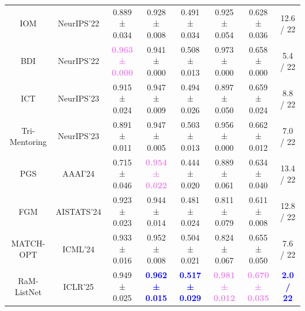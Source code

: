 \begin{table}[t!]
{\begin{tabular}{c|c|ccccc|c}
    IOM  & NeurIPS'22             & 0.889 ± 0.034                              & 0.928 ± 0.008                              & 0.491 ± 0.034                              & 0.925 ± 0.054                              & 0.628 ± 0.036                              & 12.6 / 22                             \\
    BDI   & NeurIPS'22            & \textbf{\textcolor{violet}{0.963 ± 0.000}} & 0.941 ± 0.000                              & 0.508 ± 0.013                              & 0.973 ± 0.000                              & 0.658 ± 0.000                              & 5.4 / 22                              \\
    ICT  & NeurIPS'23             & 0.915 ± 0.024                              & 0.947 ± 0.009                              & 0.494 ± 0.026                              & 0.897 ± 0.050                              & 0.659 ± 0.024                              & 8.8 / 22                              \\
    Tri-Mentoring & NeurIPS'23    & 0.891 ± 0.011                              & 0.947 ± 0.005                              & 0.503 ± 0.013                              & 0.956 ± 0.000                              & 0.662 ± 0.012                              & 7.0 / 22                              \\
    PGS  & AAAI'24             & 0.715 ± 0.046                              & \textbf{\textcolor{violet}{0.954 ± 0.022}} & 0.444 ± 0.020                              & 0.889 ± 0.061                              & 0.634 ± 0.040                              & 13.4 / 22                             \\
    FGM   & AISTATS'24            & 0.923 ± 0.023                              & 0.944 ± 0.014                              & 0.481 ± 0.024                              & 0.811 ± 0.079                              & 0.611 ± 0.008                              & 12.8 / 22                             \\
    MATCH-OPT & ICML'24        & 0.933 ± 0.016                              & 0.952 ± 0.008                              & 0.504 ± 0.021                              & 0.824 ± 0.067                              & 0.655 ± 0.050                              & 7.6 / 22                              \\ 
    RaM-ListNet & ICLR'25      & 0.949 ± 0.025                              & \textbf{\textcolor{blue}{0.962 ± 0.015}}   & \textbf{\textcolor{blue}{0.517 ± 0.029}}   & \textbf{\textcolor{violet}{0.981 ± 0.012}}                              & \textbf{\textcolor{violet}{0.670 ± 0.035}}                              & \textbf{\textcolor{blue}{2.0 / 22}}   \\

\end{tabular}}
\end{table}
